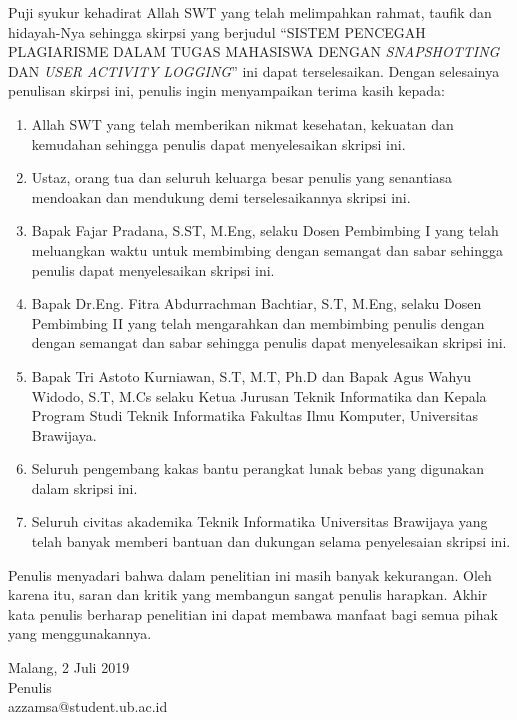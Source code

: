 \documentclass{skripsi}
\begin{document}
{\preface

  Puji syukur kehadirat Allah SWT yang telah melimpahkan rahmat,
  taufik dan hidayah-Nya sehingga skirpsi yang berjudul ``SISTEM
  PENCEGAH PLAGIARISME DALAM TUGAS MAHASISWA DENGAN \emph{SNAPSHOTTING} DAN
  \emph{USER ACTIVITY LOGGING}'' ini dapat terselesaikan. Dengan selesainya
  penulisan skirpsi ini, penulis ingin menyampaikan terima kasih
  kepada:

  \begin{singlespace}
    \begin{enumerate}
  \item{Allah SWT yang telah memberikan nikmat kesehatan, kekuatan dan
      kemudahan sehingga penulis dapat menyelesaikan skripsi ini.}
  \item{Ustaz, orang tua dan seluruh keluarga besar penulis yang
      senantiasa mendoakan dan mendukung demi terselesaikannya skripsi
      ini.}
  \item{Bapak Fajar Pradana, S.ST, M.Eng, selaku Dosen Pembimbing I
      yang telah meluangkan waktu untuk membimbing dengan semangat dan
      sabar sehingga penulis dapat menyelesaikan skripsi ini.}
  \item{Bapak Dr.Eng. Fitra Abdurrachman Bachtiar, S.T, M.Eng, selaku
      Dosen Pembimbing II yang telah mengarahkan dan membimbing
      penulis dengan dengan semangat dan sabar sehingga penulis dapat
      menyelesaikan skripsi ini.}
  \item {Bapak Tri Astoto Kurniawan, S.T, M.T, Ph.D dan Bapak Agus
      Wahyu Widodo, S.T, M.Cs selaku Ketua Jurusan Teknik Informatika
      dan Kepala Program Studi Teknik Informatika Fakultas Ilmu
      Komputer, Universitas Brawijaya.}
  \item{Seluruh pengembang kakas bantu perangkat lunak bebas yang
      digunakan dalam skripsi ini.}
  \item{Seluruh civitas akademika Teknik Informatika Universitas
      Brawijaya yang telah banyak memberi bantuan dan dukungan selama
      penyelesaian skripsi ini.}
  \end{enumerate}
  \end{singlespace}

  Penulis menyadari bahwa dalam penelitian ini masih banyak
  kekurangan. Oleh karena itu, saran dan kritik yang membangun sangat
  penulis harapkan. Akhir kata penulis berharap penelitian ini dapat
  membawa manfaat bagi semua pihak yang menggunakannya.

  \vspace{0.8cm}

  \noindent
  \hspace*{8cm}Malang, 2 Juli 2019  \vspace{1.5cm} \\

  \hspace*{6.8cm}Penulis \\
  \hspace*{8cm}azzamsa@student.ub.ac.id
}
\end{document}
